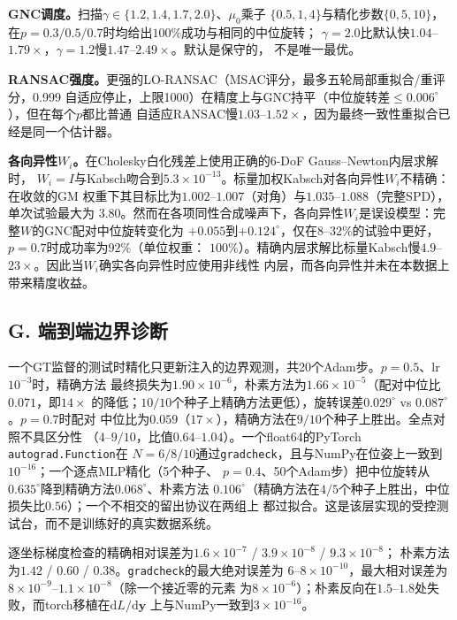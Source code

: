 \noindent\textbf{GNC调度。}扫描$\gamma\in\{1.2,1.4,1.7,2.0\}$、$\mu_0$乘子
$\{0.5,1,4\}$与精化步数$\{0,5,10\}$，在$p=0.3/0.5/0.7$时均给出$100\%$成功与相同的中位旋转；
$\gamma=2.0$比默认快$1.04$--$1.79\times$，$\gamma=1.2$慢$1.47$--$2.49\times$。默认是保守的，
不是唯一最优。

\noindent\textbf{RANSAC强度。}更强的LO-RANSAC（MSAC评分，最多五轮局部重拟合/重评分，0.999
自适应停止，上限1000）在精度上与GNC持平（中位旋转差$\le0.006^\circ$），但在每个$p$都比普通
自适应RANSAC慢$1.03$--$1.52\times$，因为最终一致性重拟合已经是同一个估计器。

\noindent\textbf{各向异性$W_i$。}在Cholesky白化残差上使用正确的6-DoF Gauss--Newton内层求解时，
$W_i=I$与Kabsch吻合到$5.3\times10^{-13}$。标量加权Kabsch对各向异性$W_i$不精确：在收敛的GM
权重下其目标比为$1.002$--$1.007$（对角）与$1.035$--$1.088$（完整SPD），单次试验最大为
$3.80$。然而在各项同性合成噪声下，各向异性$W_i$是误设模型：完整$W$的GNC配对中位旋转变化为
$+0.055$到$+0.124^\circ$，仅在$8$--$32\%$的试验中更好，$p=0.7$时成功率为$92\%$（单位权重：
$100\%$）。精确内层求解比标量Kabsch慢$4.9$--$23\times$。因此当$W_i$确实各向异性时应使用非线性
内层，而各向异性并未在本数据上带来精度收益。

\subsection*{G. 端到端边界诊断}
\label{app:e2e}

一个GT监督的测试时精化只更新注入的边界观测，共20个Adam步。$p=0.5$、lr $10^{-3}$时，精确方法
最终损失为$1.90\times10^{-6}$，朴素方法为$1.66\times10^{-5}$（配对中位比$0.071$，即$14\times$
的降低；$10/10$个种子上精确方法更低），旋转误差$0.029^\circ$ vs $0.087^\circ$。$p=0.7$时配对
中位比为$0.059$（$17\times$），精确方法在$9/10$个种子上胜出。全点对照不具区分性
（$4$--$9/10$，比值$0.64$--$1.04$）。一个float64的PyTorch \texttt{autograd.Function}在
$N=6/8/10$通过\texttt{gradcheck}，且与NumPy在位姿上一致到$10^{-16}$；一个逐点MLP精化（5个种子、
$p=0.4$、50个Adam步）把中位旋转从$0.635^\circ$降到精确方法$0.068^\circ$、朴素方法
$0.106^\circ$（精确方法在$4/5$个种子上胜出，中位损失比$0.56$）；一个不相交的留出协议在两组上
都过拟合。这是该层实现的受控测试台，而不是训练好的真实数据系统。

逐坐标梯度检查的精确相对误差为$1.6\times10^{-7}$ / $3.9\times10^{-8}$ / $9.3\times10^{-8}$；
朴素方法为$1.42$ / $0.60$ / $0.38$。\texttt{gradcheck}的最大绝对误差为
$6$--$8\times10^{-10}$，最大相对误差为$8\times10^{-9}$--$1.1\times10^{-8}$（除一个接近零的元素
为$8\times10^{-6}$）；朴素反向在$1.5$--$1.8$处失败，而torch移植在$\mathrm{d}L/\mathrm{d}\mathbf{y}$
上与NumPy一致到$3\times10^{-16}$。

